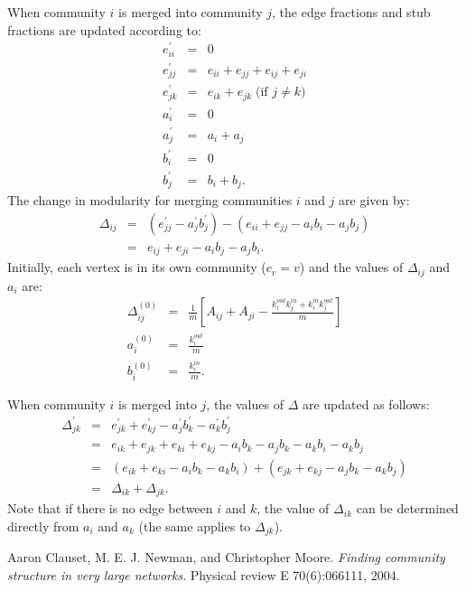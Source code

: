 \documentclass{article}
\newcommand{\beq}{\begin{eqnarray}}
\newcommand{\eeq}{\end{eqnarray}}
\begin{document}
When community $i$ is merged into community $j$, the edge fractions and stub
fractions are updated according to:
\beq
e_{ii}^\prime &=& 0 \\
e_{jj}^\prime &=& e_{ii} + e_{jj} + e_{ij} + e_{ji}\\
e_{jk}^\prime &=& e_{ik} + e_{jk} \; \text{(if $j \neq k$)}\\
a_i^\prime &=& 0 \\
a_j^\prime &=& a_i + a_j \\
b_i^\prime &=& 0 \\
b_j^\prime &=& b_i + b_j.
\eeq
The change in modularity for merging communities $i$ and $j$ are given by:
\beq
\Delta_{ij} &=& \left( e_{jj}^\prime - a_j^\prime b_j^\prime \right)
- \left(e_{ii} + e_{jj} - a_i b_i - a_j b_j \right) \\
&=&
e_{ij} + e_{ji} - a_i b_j - a_j b_i.
\eeq
Initially, each vertex is in its own community ($c_v = v$)
and the values of $\Delta_{ij}$ and $a_i$ are:
\beq
\Delta^{(0)}_{ij} &=& \frac{1}{m}\left[ A_{ij} + A_{ji} - \frac{k_i^{out} k_j^{in} + k_i^{in} k_j^{out}}{m}\right] \\
a_i^{(0)} &=& \frac{k_i^{out}}{m} \\
b_i^{(0)} &=& \frac{k_i^{in}}{m}.
\eeq

When community $i$ is merged into $j$, the values of $\Delta$ are updated
as follows:
\beq
\Delta^\prime_{jk}
&=& e_{jk}^\prime + e_{kj}^\prime - a_j^\prime b_k^\prime - a_k^\prime b_j^\prime \\
&=& e_{ik} + e_{jk} + e_{ki} + e_{kj} - a_i b_k - a_j b_k - a_k b_i - a_k b_j \\
&=& (e_{ik} + e_{ki} - a_i b_k - a_k b_i) + (e_{jk} + e_{kj} - a_j b_k - a_k b_j) \\
&=& \Delta_{ik} + \Delta_{jk}.
\eeq
Note that if there is no edge between $i$ and $k$,
the value of $\Delta_{ik}$ can be determined directly from $a_i$ and $a_k$
(the same applies to $\Delta_{jk}$).

\begin{thebibliography}{1}
Aaron Clauset, M. E. J. Newman, and Christopher Moore.
\textit{Finding community structure in very large networks}. 
Physical review E 70(6):066111, 2004.
\end{thebibliography}
\end{document}
